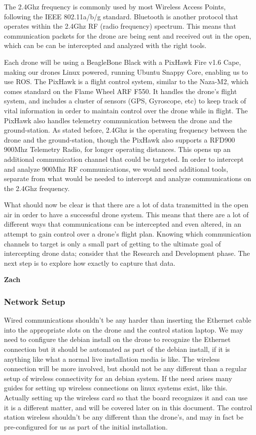 \documentclass[IEEEtran,letterpaper,10pt,notitlepage,draftclsnofoot,onecolumn]{article}
\begin{document}
The 2.4Ghz frequency is commonly used by most Wireless Access Points, following the IEEE 802.11a/b/g
standard. Bluetooth is another protocol that operates within the 2.4Ghz RF (radio frequency)
spectrum\cite{HakDaSpectrum}. This means that communication packets for the drone are being sent and received out in the
open, which can be can be intercepted and analyzed with the right tools.

Each drone will be using a BeagleBone Black with a PixHawk Fire v1.6 Cape, making our drones Linux powered, running
Ubuntu Snappy Core, enabling us to use ROS\cite{PixHawk}. The PixHawk is a flight control system, similar to the
Naza-M2, which comes standard on the Flame Wheel ARF F550. It handles the drone's flight system, and includes a cluster
of sensors (GPS, Gyroscope, etc) to keep track of vital information in order to maintain control over the drone while
in flight. The PixHawk also handles telemetry communication between the drone and the ground-station. As stated before,
2.4Ghz is the operating frequency between the drone and the ground-station, though the PixHawk also supports a RFD900
900Mhz Telemetry Radio, for longer operating distances\cite{PixHawkDocs}. This opens up an additional communication
channel that could be targeted. In order to intercept and analyze 900Mhz RF communications, we would need additional
tools, separate from what would be needed to intercept and analyze communications on the 2.4Ghz
frequency\cite{HakDaSpectrum900}.

What should now be clear is that there are a lot of data transmitted in the open air in order to have a successful
drone system. This means that there are a lot of different ways that communications can be intercepted and even
altered, in an attempt to gain control over a drone's flight plan. Knowing which communication channels to target
is only a small part of getting to the ultimate goal of intercepting drone data; consider that the Research and
Development phase. The next step is to explore how exactly to capture that data.

\textbf{Zach}

\subsubsection{Network Setup}
Wired communications shouldn't be any harder than inserting the Ethernet cable into the appropriate slots on the drone and the control station laptop.
We may need to configure the debian install on the drone to recognize the Ethernet connection but it should be automated as part of the debian install, if it is anything like what a normal live installation media is like.
The wireless connection will be more involved, but should not be any different than a regular setup of wireless connectivity for an debian system.
If the need arises many guides for setting up wireless connections on linux systems exist, like this. \cite{wirelessconfig}
Actually setting up the wireless card so that the board recognizes it and can use it is a different matter, and will be covered later on in this document.
The control station wireless shouldn't be any different than the drone's, and may in fact be pre-configured for us as part of the initial installation.
\end{document}
